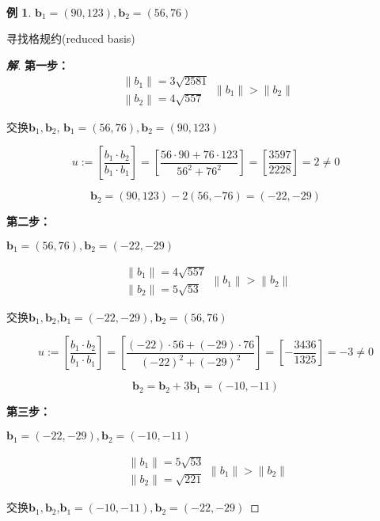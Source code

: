 \documentclass{article}
\theoremstyle{definition}
\newtheorem{example}{\indent 例}
\newenvironment{solution}{\begin{proof}[\indent\bf 解]}{\end{proof}}
\begin{document}
~\\

\begin{example}
$\mathbf{b}_{1} = (90,123), \mathbf{b}_{2} = (56,76)$

寻找格规约(reduced basis)

\begin{solution}

\textbf{第一步：}
$$
\begin{array}{l}
\left\|b_{1}\right\| =  3 \sqrt{2581} \\
\left\|b_{2}\right\|=4 \sqrt{557}
\end{array} 
\left\|b_{1}\right\|>\left\|b_{2}\right\|
$$

交换$\mathbf{b}_{1},\mathbf{b}_{2}$, $\mathbf{b}_{1} = (56,76), \mathbf{b}_{2} = (90,123)$

$$u:=\left[\frac{b_{1} \cdot b_{2}}{b_{1} \cdot b_{1}}\right] = \left[\frac{56 \cdot 90 + 76 \cdot 123}{56^2 + 76^2}\right] = \left[\frac{3597}{2228}\right] = 2 \ne 0$$

$$
\mathbf{b}_{2}=(90,123)-2(56,-76)=(-22,-29)
$$

\textbf{第二步：}

$\mathbf{b}_{1} = (56,76) , \mathbf{b}_{2} =(-22,-29)$

$$
\begin{array}{l}
\left\|b_{1}\right\|= 4 \sqrt{557}\\
\left\|b_{2}\right\|=5 \sqrt{53}
\end{array} 
\left\|b_{1}\right\|>\left\|b_{2}\right\|
$$

交换$\mathbf{b}_{1},\mathbf{b}_{2}$,$\mathbf{b}_{1} =  (-22,-29), \mathbf{b}_{2} = (56,76)$

$$u:=\left[\frac{b_{1} \cdot b_{2}}{b_{1} \cdot b_{1}}\right] = \left[\frac{(-22) \cdot 56 + (-29) \cdot 76}{(-22)^2 + (-29)^2}\right] = \left[-\frac{3436}{1325}\right] = -3 \ne 0$$

$$
\mathbf{b}_{2}=\mathbf{b}_{2} + 3\mathbf{b}_{1} = (-10,-11)
$$

\textbf{第三步：}

$\mathbf{b}_{1} = (-22,-29), \mathbf{b}_{2} =(-10,-11)$

$$
\begin{array}{l}
\left\|b_{1}\right\|= 5 \sqrt{53}\\
\left\|b_{2}\right\|= \sqrt{221}
\end{array} 
\left\|b_{1}\right\|>\left\|b_{2}\right\|
$$

交换$\mathbf{b}_{1},\mathbf{b}_{2}$,$\mathbf{b}_{1} =  (-10,-11), \mathbf{b}_{2} = (-22,-29)$


\end{solution}
\end{example}
\end{document}
